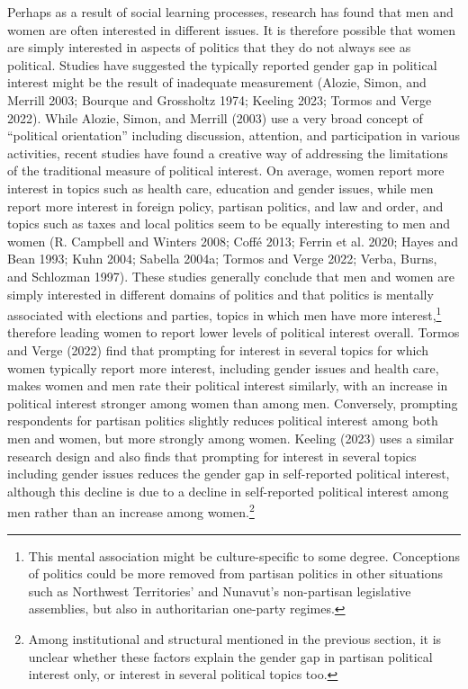 \documentclass[
  letterpaper,
  DIV=11,
  numbers=noendperiod]{scrreprt}
\begin{document}
Perhaps as a result of social learning processes, research has found
that men and women are often interested in different issues. It is
therefore possible that women are simply interested in aspects of
politics that they do not always see as political. Studies have
suggested the typically reported gender gap in political interest might
be the result of inadequate measurement (Alozie, Simon, and Merrill
2003; Bourque and Grossholtz 1974; Keeling 2023; Tormos and Verge 2022).
While Alozie, Simon, and Merrill (2003) use a very broad concept of
``political orientation'' including discussion, attention, and
participation in various activities, recent studies have found a
creative way of addressing the limitations of the traditional measure of
political interest. On average, women report more interest in topics
such as health care, education and gender issues, while men report more
interest in foreign policy, partisan politics, and law and order, and
topics such as taxes and local politics seem to be equally interesting
to men and women (R. Campbell and Winters 2008; Coffé 2013; Ferrin et
al. 2020; Hayes and Bean 1993; Kuhn 2004; Sabella 2004a; Tormos and
Verge 2022; Verba, Burns, and Schlozman 1997). These studies generally
conclude that men and women are simply interested in different domains
of politics and that politics is mentally associated with elections and
parties, topics in which men have more interest,\footnote{This mental
  association might be culture-specific to some degree. Conceptions of
  politics could be more removed from partisan politics in other
  situations such as Northwest Territories' and Nunavut's non-partisan
  legislative assemblies, but also in authoritarian one-party regimes.}
therefore leading women to report lower levels of political interest
overall. Tormos and Verge (2022) find that prompting for interest in
several topics for which women typically report more interest, including
gender issues and health care, makes women and men rate their political
interest similarly, with an increase in political interest stronger
among women than among men. Conversely, prompting respondents for
partisan politics slightly reduces political interest among both men and
women, but more strongly among women. Keeling (2023) uses a similar
research design and also finds that prompting for interest in several
topics including gender issues reduces the gender gap in self-reported
political interest, although this decline is due to a decline in
self-reported political interest among men rather than an increase among
women.\footnote{Among institutional and structural mentioned in the
  previous section, it is unclear whether these factors explain the
  gender gap in partisan political interest only, or interest in several
  political topics too.}
\end{document}
